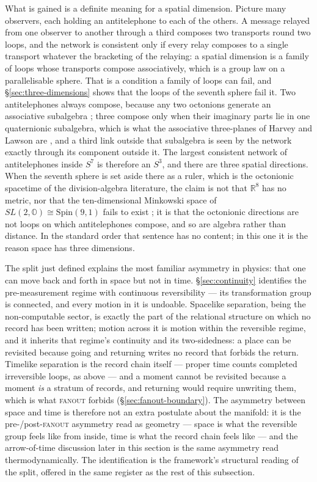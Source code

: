 What is gained is a definite meaning for a spatial dimension. Picture many observers, each holding
an antitelephone to each of the others. A message relayed from one observer to another through a
third composes two transports round two loops, and the network is consistent only if every relay
composes to a single transport whatever the bracketing of the relaying: a spatial dimension is a
family of loops whose transports compose associatively, which is a group law on a parallelisable
sphere. That is a condition a family of loops can fail, and \S\ref{sec:three-dimensions} shows
that the loops of the seventh sphere fail it. Two antitelephones always compose, because any two
octonions generate an associative subalgebra \autocite{conway_2003}; three compose only when their
imaginary parts lie in one quaternionic subalgebra, which is what the associative three-planes of
Harvey and Lawson are \autocite{harvey1982calibrated}, and a third link outside that subalgebra is
seen by the network exactly through its component outside it. The largest consistent network of
antitelephones inside $S^{7}$ is therefore an $S^{3}$, and there are three spatial directions.
When the seventh sphere is set aside there as a ruler, which is the octonionic spacetime of the
division-algebra literature, the claim is not that $\mathbb{R}^{8}$ has no metric, nor that the
ten-dimensional Minkowski space of $SL(2,\mathbb{O}) \cong \mathrm{Spin}(9,1)$ fails to exist
\autocite{baez2002octonions}; it is that the octonionic directions are not loops on which
antitelephones compose, and so are algebra rather than distance. In the standard order that
sentence has no content; in this one it is the reason space has three dimensions.

The split just defined explains the most familiar asymmetry in physics: that one can move back and
forth in space but not in time. \S\ref{sec:continuity} identifies the pre-measurement regime with
continuous reversibility --- its transformation group is connected, and every motion in it is
undoable. Spacelike separation, being the non-computable sector, is exactly the part of the
relational structure on which no record has been written; motion across it is motion within the
reversible regime, and it inherits that regime's continuity and its two-sidedness: a place can be
revisited because going and returning writes no record that forbids the return. Timelike separation
is the record chain itself --- proper time counts completed irreversible loops, as above --- and a
moment cannot be revisited because a moment \emph{is} a stratum of records, and returning would
require unwriting them, which is what \textsc{fanout} forbids (\S\ref{sec:fanout-boundary}). The
asymmetry between space and time is therefore not an extra postulate about the manifold: it is the
pre-/post-\textsc{fanout} asymmetry read as geometry --- space is what the reversible group feels
like from inside, time is what the record chain feels like --- and the arrow-of-time discussion
later in this section is the same asymmetry read thermodynamically. The identification is the
framework's structural reading of the split, offered in the same register as the rest of this
subsection.


